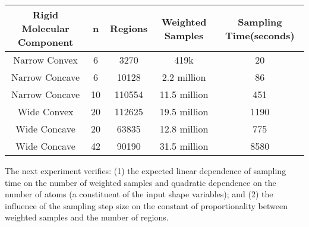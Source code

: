\documentclass[]{article}
\newcommand{\rmc}{rigid molecular component}
\begin{document}
\begin{table*}[htpb]
\centering
		\begin{tabular}{ccccc}
\hline
Rigid Molecular Component&n&Regions&Weighted Samples& Sampling Time(seconds)\\\hline\hline
Narrow Convex &6&3270&419k&20\\\hline
Narrow Concave &6&10128&2.2 million& 86\\\hline
Narrow Concave &10&110554&11.5 million& 451\\\hline
Wide Convex &20&112625&19.5 million&1190\\ \hline
Wide Concave &20&63835&12.8 million& 775\\ \hline
Wide Concave &42&90190&31.5 million& 8580\\ \hline
\end{tabular}
\caption{\scriptsize \textbf{Verifying the Core Algorithm's Time Complexity}:
Number of regions and sampling time for different input \rmc\ pairs. 
These are averages for sampling 10 randomly chosen initial 5D nodes
and all their descendants. In these results, the ratio of the radius to step size 
is set to 3. See Section \ref{sec:results:complexity}}
\label{tab:performance}
\end{table*}
\begin{figure*}[htpb]
\centering
{}
\caption{\scriptsize \textbf{Verifying Time Complexity}: (a) The plot of the number of atoms and the number
of samples against the sampling time. The plot also shows bivariate function fit to this
data. (b) shows slices of the bivariate function in (a) at $n =$ 15, 25 and 35. These
show a linear relationship between the number of samples and the sampling time
when $n$ is kept constant. (c) Plot of the number of weighted samples against
the number of regions for the wide concave \rmc\ system (42 Atoms). The plot shows
that the linear factor in regions vs weighted samples also depends on step
size. As the step-size increases, the slope of the line 
increases (see text in Section \ref{sec:results:complexity} for details).}
\end{figure*}

The next experiment verifies: (1) the expected linear dependence of sampling
time on the number of weighted samples and quadratic dependence on the number
of atoms (a constituent of the input shape variables); and (2) the influence of
the sampling step size on the constant of proportionality between weighted samples 
and the number of regions.
\end{document}
